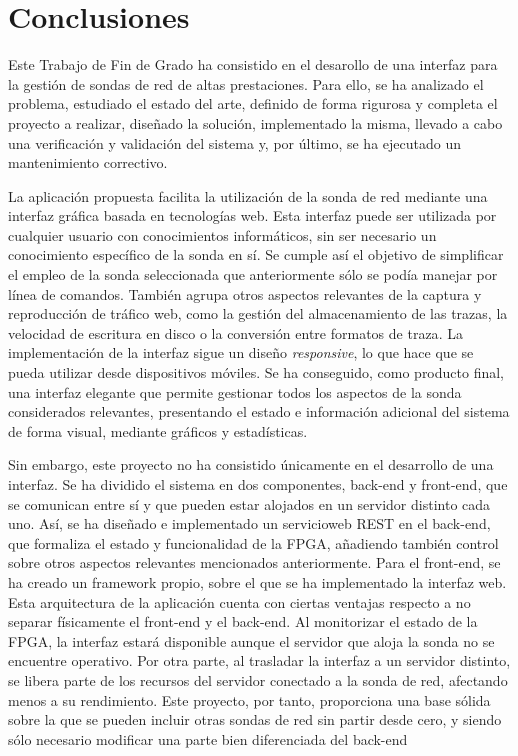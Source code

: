 \chapter{Conclusiones\label{cap:conclusiones}}

Este Trabajo de Fin de Grado ha consistido en el desarollo de una interfaz para la gestión de sondas de red de altas prestaciones.
Para ello, se ha analizado el problema, estudiado el estado del arte, definido de forma rigurosa y completa el proyecto a realizar, diseñado la solución, implementado la misma, llevado a cabo una verificación y validación del sistema y, por último, se ha ejecutado un mantenimiento correctivo.

La aplicación propuesta facilita la utilización de la sonda de red mediante una interfaz gráfica basada en tecnologías web.
Esta interfaz puede ser utilizada por cualquier usuario con conocimientos informáticos, sin ser necesario un conocimiento específico de la sonda en sí.
Se cumple así el objetivo de simplificar el empleo de la sonda seleccionada que anteriormente sólo se podía manejar por línea de comandos.
También agrupa otros aspectos relevantes de la captura y reproducción de tráfico web, como la gestión del almacenamiento de las \glspl{traza}, la velocidad de escritura en disco o la conversión entre formatos de \gls{traza}.
La implementación de la interfaz sigue un diseño \textit{responsive}, lo que hace que se pueda utilizar desde dispositivos móviles.
Se ha conseguido, como producto final, una interfaz elegante que permite gestionar todos los aspectos de la sonda considerados relevantes, presentando el estado e información adicional del sistema de forma visual, mediante gráficos y estadísticas.

Sin embargo, este proyecto no ha consistido únicamente en el desarrollo de una interfaz.
Se ha dividido el sistema en dos componentes, \gls{back-end} y \gls{front-end}, que se comunican entre sí y que pueden estar alojados en un servidor distinto cada uno.
Así, se ha diseñado e implementado un \gls{servicioweb} \gls{REST} en el \gls{back-end}, que formaliza el estado y funcionalidad de la \gls{FPGA}, añadiendo también control sobre otros aspectos relevantes mencionados anteriormente.
Para el \gls{front-end}, se ha creado un \gls{framework} propio, sobre el que se ha implementado la interfaz web.
Esta arquitectura de la aplicación cuenta con ciertas ventajas respecto a no separar físicamente el \gls{front-end} y el \gls{back-end}.
Al monitorizar el estado de la \gls{FPGA}, la interfaz estará disponible aunque el servidor que aloja la sonda no se encuentre operativo.
Por otra parte, al trasladar la interfaz a un servidor distinto, se libera parte de los recursos del servidor conectado a la sonda de red, afectando menos a su rendimiento.
Este proyecto, por tanto, proporciona una base sólida sobre la que se pueden incluir otras sondas de red sin partir desde cero, y siendo sólo necesario modificar una parte bien diferenciada del \gls{back-end}

